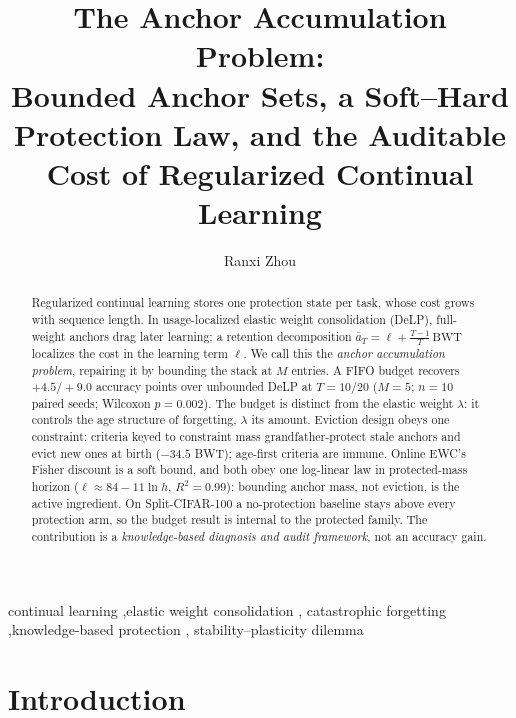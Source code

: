 \documentclass[review,11pt,number]{elsarticle}
\newcommand{\delp}{DeLP}
\begin{document}
\linenumbers

\begin{frontmatter}

\title{The Anchor Accumulation Problem:\\Bounded Anchor Sets, a Soft--Hard
Protection Law, and the Auditable Cost of Regularized Continual Learning}

\author[hnucm]{Ranxi Zhou}
\address[hnucm]{Hunan University of Chinese Medicine, 300 Xueshi Avenue,
Hanpu, Yuelu District, Changsha 410208, Hunan, China}

\begin{abstract}
Regularized continual learning stores one protection state per task,
whose cost grows with sequence length. In usage-localized elastic weight
consolidation (\delp{}), full-weight anchors drag later learning; a
retention decomposition $\bar a_T = \ell + \frac{T-1}{T}\,\mathrm{BWT}$
localizes the cost in the learning term $\ell$. We call this the
\emph{anchor accumulation problem}, repairing it by bounding the stack at
$M$ entries. A FIFO budget recovers $+4.5/+9.0$ accuracy points over
unbounded \delp{} at $T{=}10/20$ ($M{=}5$; $n{=}10$ paired seeds;
Wilcoxon $p{=}0.002$). The budget is distinct from the elastic weight
$\lambda$: it controls the age structure of forgetting, $\lambda$ its
amount. Eviction design obeys one constraint: criteria keyed to constraint
mass grandfather-protect stale anchors and evict new ones at birth
($-34.5$ BWT); age-first criteria are immune. Online EWC's Fisher discount
is a soft bound, and both obey one log-linear law in protected-mass horizon
($\ell \approx 84 - 11\ln h$, $R^2{=}0.99$): bounding anchor mass, not
eviction, is the active ingredient. On Split-CIFAR-100 a no-protection
baseline stays above every protection arm, so the budget result is internal
to the protected family. The contribution is a
\emph{knowledge-based diagnosis and audit framework}, not an accuracy
gain.
\end{abstract}

\begin{keyword}
continual learning \sep elastic weight consolidation \sep
catastrophic forgetting \sep knowledge-based protection \sep
stability--plasticity dilemma
\end{keyword}

\end{frontmatter}

\section{Introduction}
\label{sec:intro}
\end{document}
